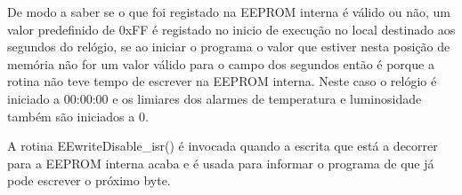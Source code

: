 \documentclass[a4paper,12pt]{article}
\begin{document}
De modo a saber se o que foi registado na EEPROM interna é válido ou não, um valor predefinido de 0xFF é registado no inicio de execução no local destinado aos segundos do relógio, se ao iniciar o programa o valor que estiver nesta posição de memória não for um valor válido para o campo dos segundos então é porque a rotina não teve tempo de escrever na EEPROM interna. Neste caso o relógio é iniciado a 00:00:00 e os limiares dos alarmes de temperatura e luminosidade também são iniciados a 0.

A rotina EEwriteDisable_isr() é invocada quando a escrita que está a decorrer para a EEPROM interna acaba e é usada para  informar o programa  de que já pode escrever o próximo byte.
\end{document}
